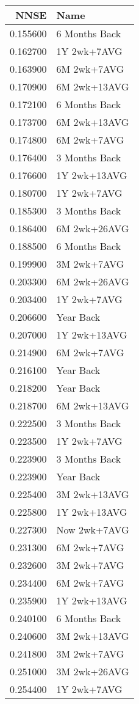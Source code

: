 \begin{tabular}{rl}
NNSE & Name \\
\hline
0.155600 & 6 Months Back \\
0.162700 & 1Y 2wk+7AVG \\
0.163900 & 6M 2wk+7AVG \\
0.170900 & 6M 2wk+13AVG \\
0.172100 & 6 Months Back \\
0.173700 & 6M 2wk+13AVG \\
0.174800 & 6M 2wk+7AVG \\
0.176400 & 3 Months Back \\
0.176600 & 1Y 2wk+13AVG \\
0.180700 & 1Y 2wk+7AVG \\
0.185300 & 3 Months Back \\
0.186400 & 6M 2wk+26AVG \\
0.188500 & 6 Months Back \\
0.199900 & 3M 2wk+7AVG \\
0.203300 & 6M 2wk+26AVG \\
0.203400 & 1Y 2wk+7AVG \\
0.206600 & Year Back \\
0.207000 & 1Y 2wk+13AVG \\
0.214900 & 6M 2wk+7AVG \\
0.216100 & Year Back \\
0.218200 & Year Back \\
0.218700 & 6M 2wk+13AVG \\
0.222500 & 3 Months Back \\
0.223500 & 1Y 2wk+7AVG \\
0.223900 & 3 Months Back \\
0.223900 & Year Back \\
0.225400 & 3M 2wk+13AVG \\
0.225800 & 1Y 2wk+13AVG \\
0.227300 & Now 2wk+7AVG \\
0.231300 & 6M 2wk+7AVG \\
0.232600 & 3M 2wk+7AVG \\
0.234400 & 6M 2wk+7AVG \\
0.235900 & 1Y 2wk+13AVG \\
0.240100 & 6 Months Back \\
0.240600 & 3M 2wk+13AVG \\
0.241800 & 3M 2wk+7AVG \\
0.251000 & 3M 2wk+26AVG \\
0.254400 & 1Y 2wk+7AVG \\

\end{tabular}
